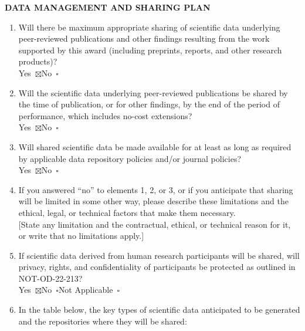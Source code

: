 \documentclass[11pt]{article}
\newcommand{\boxon}{\ensuremath{\boxtimes}}
\newcommand{\boxoff}{\ensuremath{\square}}
\begin{document}
\textbf{DATA MANAGEMENT AND SHARING PLAN}

\begin{enumerate}[label=\textbf{\arabic*.}, leftmargin=1.5em, itemsep=3pt, topsep=2pt, parsep=1pt]

    \item Will there be maximum appropriate sharing of scientific data underlying peer-reviewed publications and other findings resulting from the work supported by this award (including preprints, reports, and other research products)? \\
        Yes~\boxon\quad No~\boxoff

    \item Will the scientific data underlying peer-reviewed publications be shared by the time of publication, or for other findings, by the end of the period of performance, which includes no-cost extensions? \\
        Yes~\boxon\quad No~\boxoff

    \item Will shared scientific data be made available for at least as long as required by applicable data repository policies and/or journal policies? \\
        Yes~\boxon\quad No~\boxoff

    \item If you answered ``no'' to elements 1, 2, or 3, or if you anticipate that sharing will be limited in some other way, please describe these limitations and the ethical, legal, or technical factors that make them necessary. \\
        {}[State any limitation and the contractual, ethical, or technical reason for it, or write that no limitations apply.]

    \item If scientific data derived from human research participants will be shared, will privacy, rights, and confidentiality of participants be protected as outlined in NOT-OD-22-213? \\
        Yes~\boxon\quad No~\boxoff\quad Not Applicable~\boxoff

    \item In the table below, the key types of scientific data anticipated to be generated and the repositories where they will be shared:


\end{enumerate}
\end{document}

